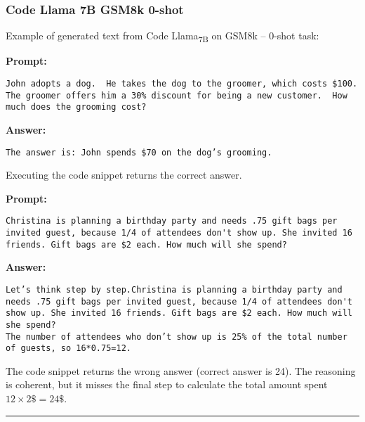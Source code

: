 \subsubsection*{Code Llama 7B GSM8k 0-shot}
\noindent Example of generated text from Code Llama\textsubscript{7B} on GSM8k -- 0-shot task:
\begin{displayquote}
	\textbf{Prompt:}
	\begin{Verbatim}[fontsize=\small,breaklines]
John adopts a dog.  He takes the dog to the groomer, which costs $100.  The groomer offers him a 30% discount for being a new customer.  How much does the grooming cost?
    \end{Verbatim}
	\textbf{Answer:}
	\begin{Verbatim}[fontsize=\small,breaklines]
The answer is: John spends $70 on the dog’s grooming.
    \end{Verbatim}
\end{displayquote}
Executing the code snippet returns the correct answer.
\begin{displayquote}
	\textbf{Prompt:}
	\begin{Verbatim}[fontsize=\small,breaklines]
Christina is planning a birthday party and needs .75 gift bags per invited guest, because 1/4 of attendees don't show up. She invited 16 friends. Gift bags are $2 each. How much will she spend?
    \end{Verbatim}
	\textbf{Answer:}
	\begin{Verbatim}[fontsize=\small,breaklines]
Let’s think step by step.Christina is planning a birthday party and needs .75 gift bags per invited guest, because 1/4 of attendees don't show up. She invited 16 friends. Gift bags are $2 each. How much will she spend?
The number of attendees who don’t show up is 25% of the total number of guests, so 16*0.75=12.
    \end{Verbatim}
\end{displayquote}
The code snippet returns the wrong answer (correct answer is 24).
The reasoning is coherent, but it misses the final step to calculate the total amount spent $12 \times 2\$ = 24\$$.

\noindent\rule{\textwidth}{0.4pt}

